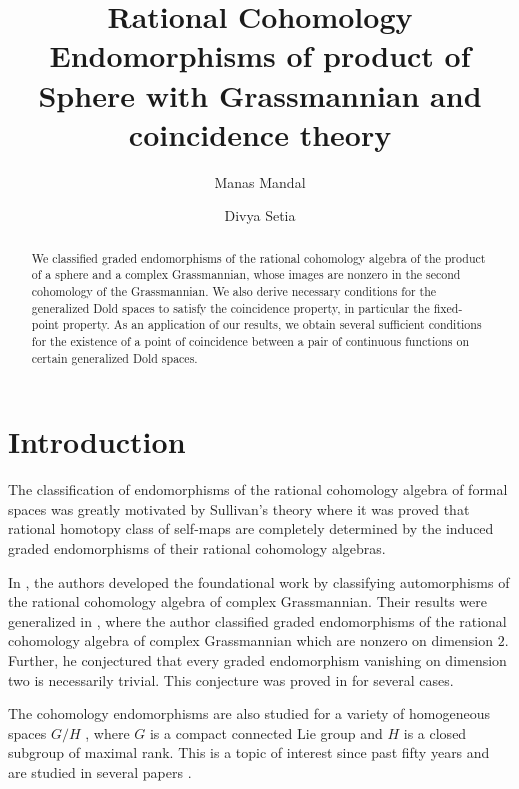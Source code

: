 \documentclass{amsart}
\title[Graded Endomorphisms of $H^*(\mathbb{S}^m \times \mathbb{C}G_{n,k};\mathbb Q)$]{%
Rational Cohomology Endomorphisms of product of Sphere with Grassmannian and coincidence theory%
}
\author[M. Mandal]{Manas Mandal}
\author[D. Setia]{Divya Setia}
\begin{document}
	\begin{abstract}
		We classified graded endomorphisms of the rational cohomology algebra of the product of a sphere and a complex Grassmannian, whose images are nonzero  in the second cohomology of the Grassmannian.
		We also derive necessary conditions for the generalized Dold spaces to satisfy the coincidence property, in particular the fixed-point property. As an application of our results, we obtain several sufficient conditions for the existence of a point of coincidence between a pair of continuous functions on certain generalized Dold spaces. 
	\end{abstract}
	
	\maketitle
	
	\section{Introduction} \label{intro}
	The classification of endomorphisms of the rational cohomology algebra of formal spaces was greatly motivated by Sullivan's theory where it was  proved that rational %
homotopy class of %
self-maps are completely determined by the induced graded endomorphisms of their rational cohomology algebras. 
	
	In \cite{brewster}, the authors developed the foundational work by classifying automorphisms of the rational cohomology algebra of complex Grassmannian. Their results were generalized in \cite{hoffman}, where the author classified graded endomorphisms of the rational cohomology algebra of complex Grassmannian which are nonzero on dimension $2$. Further, he conjectured that every graded endomorphism  vanishing on dimension two is necessarily trivial. This conjecture was proved in \cite{glover-homer} for several cases.
	
	The cohomology endomorphisms are also studied for a variety of %
homogeneous spaces $G/H$%
, where $G$ is a compact connected Lie group and $H$ is a closed
	subgroup of maximal rank. This is a topic of %
interest since past %
fifty years %
and are studied %
in several papers \cite{shiga-tezuka2, brewster-homer, hoffman-homer, Papadima, duan, duan-fang, duan-zhao, lin, goswami-sarkar}. 
	
\end{document}
